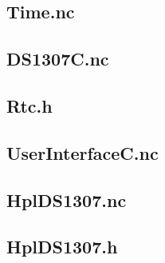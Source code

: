 \documentclass[12pt,a4paper,titlepage,oneside]{article}
\begin{document}
{\subsection{Time.nc}


\subsection{DS1307C.nc}


\subsection{Rtc.h}


\subsection{UserInterfaceC.nc}


\subsection{HplDS1307.nc}


\subsection{HplDS1307.h}


}%
\end{document}
